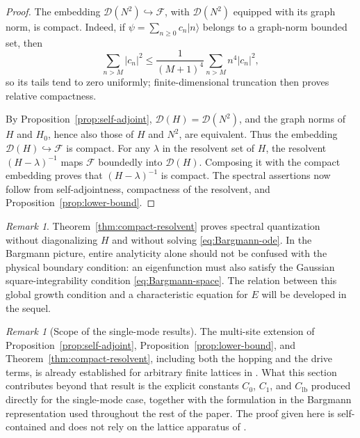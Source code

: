\documentclass[11pt]{article}
\theoremstyle{remark}
\newtheorem{remark}[theorem]{Remark}
\newcommand{\Fock}{\mathcal{F}}
\newcommand{\Dom}{\mathcal{D}}
\begin{document}
\begin{proof}
The embedding \(\Dom(N^2)\hookrightarrow\Fock\), with \(\Dom(N^2)\) equipped
with its graph norm, is compact.  Indeed, if \(\psi=\sum_{n\geq0}c_n|n\rangle\)
belongs to a graph-norm bounded set, then
\begin{equation}
 \sum_{n>M}|c_n|^2
 \leq \frac{1}{(M+1)^4}\sum_{n>M}n^4|c_n|^2,
 \label{eq:tail-bound}
\end{equation}
so its tails tend to zero uniformly; finite-dimensional truncation then proves
relative compactness.

By Proposition~\ref{prop:self-adjoint}, \(\Dom(H)=\Dom(N^2)\), and the graph norms
of \(H\) and \(H_0\), hence also those of \(H\) and \(N^2\), are equivalent.
Thus the embedding \(\Dom(H)\hookrightarrow\Fock\) is compact.  For any
\(\lambda\) in the resolvent set of \(H\), the resolvent
\((H-\lambda)^{-1}\) maps \(\Fock\) boundedly into \(\Dom(H)\).  Composing it
with the compact embedding proves that \((H-\lambda)^{-1}\) is compact.
The spectral assertions now follow from self-adjointness, compactness of the
resolvent, and Proposition~\ref{prop:lower-bound}.
\end{proof}

\begin{remark}
Theorem~\ref{thm:compact-resolvent} proves spectral quantization without
diagonalizing \(H\) and without solving \eqref{eq:Bargmann-ode}.  In the
Bargmann picture, entire analyticity alone should not be confused with the
physical boundary condition: an eigenfunction must also satisfy the Gaussian
square-integrability condition \eqref{eq:Bargmann-space}.  The relation between
this global growth condition and a characteristic equation for \(E\) will be
developed in the sequel.
\end{remark}

\begin{remark}[Scope of the single-mode results]
The multi-site extension of Proposition~\ref{prop:self-adjoint},
Proposition~\ref{prop:lower-bound}, and Theorem~\ref{thm:compact-resolvent},
including both the hopping and the drive terms, is already established for
arbitrary finite lattices in \cite{StachuraPuszWojtkiewicz2020BoseHubbard}.
What this section contributes beyond that result is the explicit constants
\(C_0\), \(C_1\), and \(C_{\mathrm{lb}}\) produced directly for the
single-mode case, together with the formulation in the Bargmann
representation used throughout the rest of the paper.  The proof given here
is self-contained and does not rely on the lattice apparatus of
\cite{StachuraPuszWojtkiewicz2020BoseHubbard}.
\end{remark}
\end{document}
